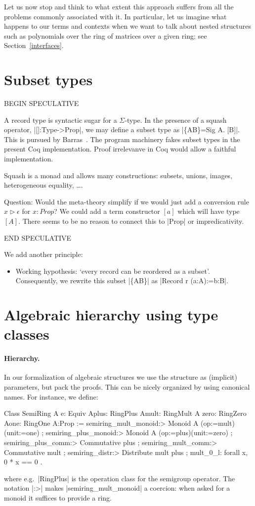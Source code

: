 \documentclass[a4paper,10pt, runningheads]{llncs}
\begin{document}
Let us now stop and think to what extent this approach suffers from all the problems commonly
associated with it. In particular, let us imagine what happens to our terms and contexts when we
want to talk about nested structures such as polynomials over the ring of matrices over a
given ring; see Section~\ref{interfaces}.

\section{Subset types}
BEGIN SPECULATIVE

A record type is  syntactic sugar for a $\Sigma$-type. In the presence of a
squash operator, |[]:Type->Prop|, we may define a subset type as |\{A\mid B\}=Sig A. [B]|. This is
pursued by Barras~\cite{Barras:subset,Werner}. The program machinery fakes subset types in the
present Coq implementation. Proof irrelevanve in Coq would allow a faithful
implementation.

Squash is a monad and allows many constructions: subsets, unions, images, heterogeneous equality,
\ldots.

Question: Would the meta-theory simplify if we would just add a conversion rule $x\triangleright
\epsilon$ for $x:Prop$? We could add a term constructor $[a]$ which will have type $[A]$. There
seems to be no reason to connect this to |Prop| or impredicativity.

END SPECULATIVE

We add another principle:
\begin{itemize}\setcounter{enumi}{3}
 \item Working hypothesis: `every record can be reordered as a subset'. Consequently, we
rewrite this subset |\{A\mid B\}| as |Record r (a:A):={b:B}|.
\end{itemize}

\section{Algebraic hierarchy using type classes}\label{classes}
\paragraph{Hierarchy.}\label{hierarchy}
In our formalization of algebraic structures we use the structure as (implicit) parameters, but
pack the proofs. This can be nicely organized by using canonical names. For instance, we define:
\begin{code}
Class SemiRing A {e: Equiv A}{plus: RingPlus A}{mult: RingMult A}
                 {zero: RingZero A}{one: RingOne A}:Prop :=
  { semiring_mult_monoid:> Monoid A (op:=mult)(unit:=one)
  ; semiring_plus_monoid:> Monoid A (op:=plus)(unit:=zero)
  ; semiring_plus_comm:> Commutative plus
  ; semiring_mult_comm:> Commutative mult
  ; semiring_distr:> Distribute mult plus
  ; mult_0_l: forall x, 0 * x == 0 }.
\end{code}
where e.g.\ |RingPlus| is the operation class for the semigroup operator.
The notation |:>| makes |semiring_mult_monoid| a coercion: when asked for a monoid it suffices to
provide a ring.
\end{document}
